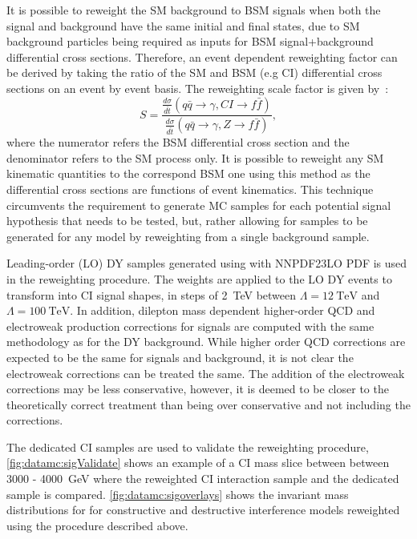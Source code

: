 It is possible to reweight the SM background to BSM signals when both the signal and background have the same initial and final states, due to  SM background particles being required as inputs for BSM signal+background differential cross sections. Therefore, an event dependent reweighting factor can be derived by taking the ratio of the SM and BSM (e.g CI) differential cross sections on an event by event basis. The reweighting scale factor is given by~\cite{EXOT-2016-05}:
\begin{equation}
    S = \frac{\frac{d\sigma}{d\hat{t}}(q\bar{q} \rightarrow \gamma, CI \rightarrow f\bar{f})}{\frac{d\sigma}{d\hat{t}}(q\bar{q} \rightarrow \gamma, Z \rightarrow f\bar{f})},
\end{equation}
where the numerator refers the BSM differential cross section and the denominator refers to the SM process only. It is possible to reweight any SM kinematic quantities to the correspond BSM one using this method as the differential cross sections are functions of event kinematics. This technique circumvents the requirement to generate MC samples for each potential signal hypothesis that needs to be tested, but, rather allowing for samples to be generated for any model by reweighting from a single background sample. 

Leading-order (LO) DY samples generated using  with NNPDF23LO PDF is used in the reweighting procedure. The weights are applied to the LO DY events to transform into CI signal shapes, in steps of \SI{2}{\tera\electronvolt} between $\Lambda = \SI{12}{\tera\electronvolt}$ and $\Lambda = \SI{100}{\tera\electronvolt}$. In addition, dilepton mass dependent higher-order QCD and electroweak production corrections for signals are computed with the same methodology as for the DY background. While higher order QCD corrections are expected to be the same for signals and background, it is not clear the electroweak corrections can be treated the same. The addition of the electroweak corrections may be less conservative, however, it is deemed to be closer to the theoretically correct treatment than being over conservative and not including the corrections. 

The dedicated CI samples are used to validate the reweighting procedure, \cref{fig:datamc:sigValidate} shows an example of a CI mass slice between between 3000 - \SI{4000}{\giga\electronvolt} where the reweighted CI interaction sample and the dedicated sample is compared. \cref{fig:datamc:sigoverlays} shows the invariant mass distributions for for constructive and destructive interference models reweighted using the procedure described above. 

